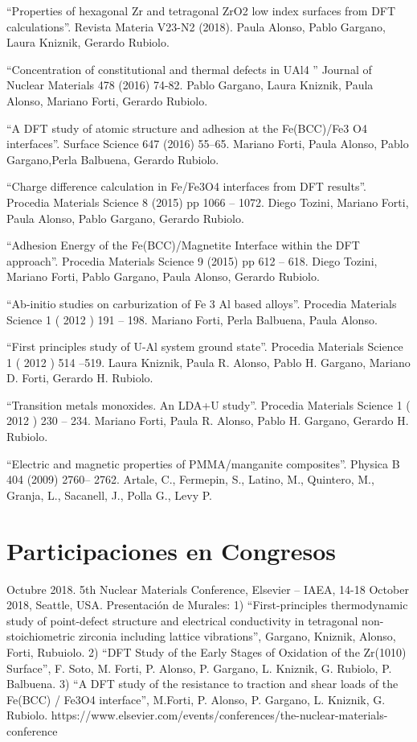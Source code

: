 ``Properties of hexagonal Zr and tetragonal ZrO2 low index surfaces from
DFT calculations''. Revista Materia V23-N2 (2018). Paula Alonso, Pablo
Gargano, Laura Kniznik, Gerardo Rubiolo.

``Concentration of constitutional and thermal defects in UAl4 '' Journal
of Nuclear Materials 478 (2016) 74-82. Pablo Gargano, Laura Kniznik,
Paula Alonso, Mariano Forti, Gerardo Rubiolo.

``A DFT study of atomic structure and adhesion at the Fe(BCC)/Fe3 O4
interfaces''. Surface Science 647 (2016) 55--65. Mariano Forti, Paula
Alonso, Pablo Gargano,Perla Balbuena, Gerardo Rubiolo.

``Charge difference calculation in Fe/Fe3O4 interfaces from DFT
results''. Procedia Materials Science 8 (2015) pp 1066 -- 1072. Diego
Tozini, Mariano Forti, Paula Alonso, Pablo Gargano, Gerardo Rubiolo.

``Adhesion Energy of the Fe(BCC)/Magnetite Interface within the DFT
approach''. Procedia Materials Science 9 (2015) pp 612 -- 618. Diego
Tozini, Mariano Forti, Pablo Gargano, Paula Alonso, Gerardo Rubiolo.

``Ab-initio studies on carburization of Fe 3 Al based alloys''. Procedia
Materials Science 1 ( 2012 ) 191 -- 198. Mariano Forti, Perla Balbuena,
Paula Alonso.

``First principles study of U-Al system ground state''. Procedia
Materials Science 1 ( 2012 ) 514 --519. Laura Kniznik, Paula R. Alonso,
Pablo H. Gargano, Mariano D. Forti, Gerardo H. Rubiolo.

``Transition metals monoxides. An LDA+U study''. Procedia Materials
Science 1 ( 2012 ) 230 -- 234. Mariano Forti, Paula R. Alonso, Pablo H.
Gargano, Gerardo H. Rubiolo.

``Electric and magnetic properties of PMMA/manganite composites''.
Physica B 404 (2009) 2760-- 2762. Artale, C., Fermepin, S., Latino, M.,
Quintero, M., Granja, L., Sacanell, J., Polla G., Levy P.

\section{Participaciones en
Congresos}\label{participaciones-en-congresos}

Octubre 2018. 5th Nuclear Materials Conference, Elsevier -- IAEA, 14-18
October 2018, Seattle, USA. Presentación de Murales: 1)
``First-principles thermodynamic study of point-defect structure and
electrical conductivity in tetragonal non-stoichiometric zirconia
including lattice vibrations'', Gargano, Kniznik, Alonso, Forti,
Rubuiolo. 2) ``DFT Study of the Early Stages of Oxidation of the
Zr(1010) Surface'', F. Soto, M. Forti, P. Alonso, P. Gargano, L.
Kniznik, G. Rubiolo, P. Balbuena. 3) ``A DFT study of the resistance to
traction and shear loads of the Fe(BCC) / Fe3O4 interface'', M.Forti, P.
Alonso, P. Gargano, L. Kniznik, G. Rubiolo.
https://www.elsevier.com/events/conferences/the-nuclear-materials-conference

